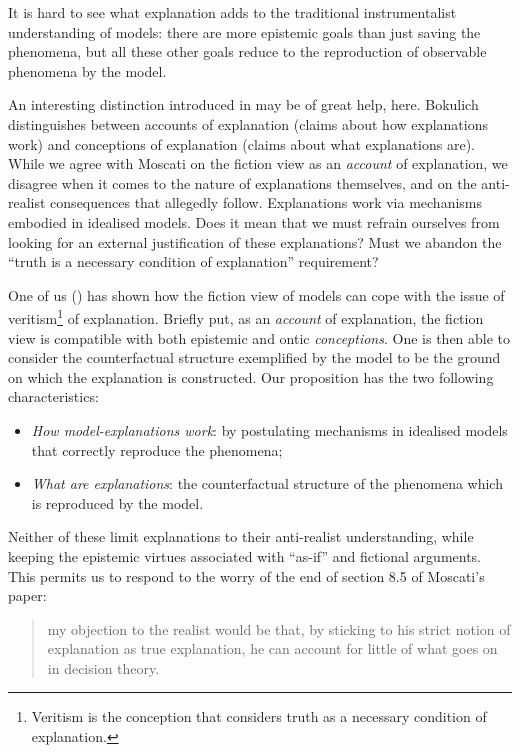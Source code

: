 \documentclass[a4paper,11pt]{article}
\theoremstyle{definition}
\begin{document}
It is hard to see what explanation adds to the traditional instrumentalist understanding of models: there are more epistemic goals than just saving the phenomena, but all these other goals reduce to the reproduction of observable phenomena by the model.

An interesting distinction introduced in \citep{Bokulich2018} may be of great help, here. Bokulich distinguishes between accounts of explanation (claims about how explanations work) and conceptions of explanation (claims about what explanations are). While we agree with Moscati on the fiction view as an \textit{account} of explanation, we disagree when it comes to the nature of explanations themselves, and on the anti-realist consequences that allegedly follow. Explanations work via mechanisms embodied in idealised models. Does it mean that we must refrain ourselves from looking for an external justification of these explanations? Must we abandon the ``truth is a necessary condition of explanation'' requirement?

One of us (\citep{Brandelet2023}) has shown how the fiction view of models can cope with the issue of veritism\footnote{Veritism is the conception that considers truth as a necessary condition of explanation.} of explanation. Briefly put, as an \textit{account} of explanation, the fiction view is compatible with both epistemic and ontic \textit{conceptions}. One is then able to consider the counterfactual structure exemplified by the model to be the ground on which the explanation is constructed. Our proposition has the two following characteristics:

\begin{itemize}
    \item \textit{How model-explanations work}: by postulating mechanisms in idealised models that correctly reproduce the phenomena;
    \item \textit{What are explanations}: the counterfactual structure of the phenomena which is reproduced by the model.
\end{itemize}

Neither of these limit explanations to their anti-realist understanding, while keeping the epistemic virtues associated with ``as-if'' and fictional arguments. This permits us to respond to the worry of the end of section 8.5 of Moscati's paper:

\begin{quote}
    my objection to the realist would be that, by sticking to his strict notion of explanation as true explanation, he can account for little of what goes on in decision theory. \citep[p.~22]{Moscati2023}
\end{quote}
\end{document}
